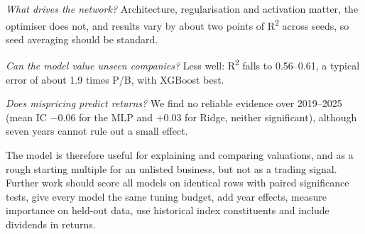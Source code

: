 \documentclass[conference]{IEEEtran}
\begin{document}
\emph{What drives the network?} Architecture, regularisation and activation matter, the optimiser does not, and results vary by about two points of R\textsuperscript{2} across seeds, so seed averaging should be standard.

\emph{Can the model value unseen companies?} Less well: R\textsuperscript{2} falls to 0.56--0.61, a typical error of about 1.9 times P/B, with XGBoost best.

\emph{Does mispricing predict returns?} We find no reliable evidence over 2019--2025 (mean IC $-0.06$ for the MLP and $+0.03$ for Ridge, neither significant), although seven years cannot rule out a small effect.

The model is therefore useful for explaining and comparing valuations, and as a rough starting multiple for an unlisted business, but not as a trading signal. Further work should score all models on identical rows with paired significance tests, give every model the same tuning budget, add year effects, measure importance on held-out data, use historical index constituents and include dividends in returns.
\end{document}
